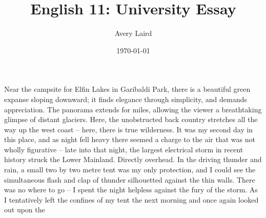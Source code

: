\documentclass[letterpaper,10pt,oneside,headsepline]{scrreprt}
\author{Avery Laird}
\title{English 11: University Essay}
\date{\today}
\begin{document}
Near the campsite for Elfin Lakes in Garibaldi Park, there is a beautiful green expanse sloping downward; it finds elegance through simplicity, and demands appreciation. The panorama extends for miles, allowing the viewer a breathtaking glimpse of distant glaciers. Here, the unobstructed back country stretches all the way up the west coast -- here, there is true wilderness. It was my second day in this place, and as night fell heavy there seemed a charge to the air that was not wholly figurative -- late into that night, the largest electrical storm in recent history struck the Lower Mainland. Directly overhead. In the driving thunder and rain, a small two by two metre tent was my only protection, and I could see the simultaneous flash and clap of thunder silhouetted against the thin walls. There was no where to go -- I spent the night helpless against the fury of the storm. As I tentatively left the confines of my tent the next morning and once again looked out upon the          
\end{document}
